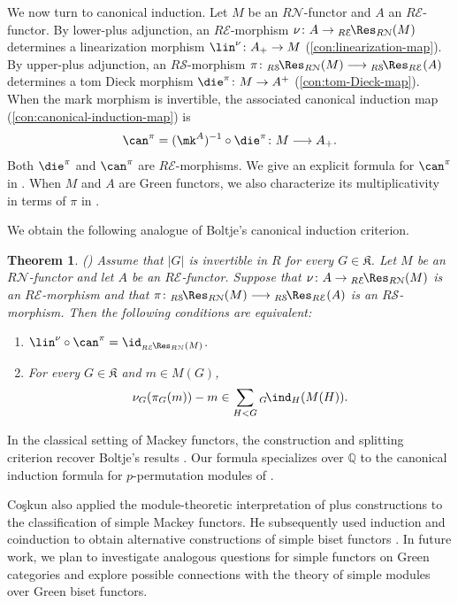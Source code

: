 \documentclass{amsart}
\numberwithin{equation}{section}%
\newtheorem{Thm}[equation]{Theorem}
\theoremstyle{remark}
\theoremstyle{definition}
\newcommand{\e}{\mathcal E}
\newcommand{\s}{\mathcal S}
\newcommand{\n}{\mathcal N}
\newcommand{\lind}[1]{{}_{#1}\!\ind}
\newcommand{\iRes}[2]{{}_{#1}\!\Res_{#2}}
\begin{document}
We now turn to canonical induction. Let $M$ be an
$R\mathcal N$-functor and $A$ an $R\mathcal E$-functor.
By lower-plus adjunction, an $R\mathcal E$-morphism
$\nu\colon A\to\iRes{R\e}{R\n}(M)$
determines a linearization morphism
$\lin^\nu\colon A_+\to M$ (\cref{con:linearization-map}).
By upper-plus adjunction, an $R\mathcal S$-morphism $\pi\colon\iRes{R\s}{R\n}(M)\longrightarrow\iRes{R\s}{R\e}(A)$
determines a tom Dieck morphism $\die^\pi\colon M\to A^+$ (\cref{con:tom-Dieck-map}).
When the mark morphism is invertible, the associated
canonical induction map (\cref{con:canonical-induction-map}) is
\[
\can^\pi=(\mk^A)^{-1}\circ\die^\pi
\colon M\longrightarrow A_+.
\]
Both $\die^\pi$ and $\can^\pi$ are
$R\mathcal E$-morphisms. We give an explicit formula
for $\can^\pi$ in .
When $M$ and $A$ are Green functors, we also
characterize its multiplicativity in terms of $\pi$ in
.


We obtain the following analogue of Boltje's
canonical induction criterion.
%
\begin{Thm}()
\label{thm:intro-canonical-induction}
Assume that $|G|$ is invertible in $R$ for every
$G\in\mathfrak K$. Let $M$ be an
$R\mathcal N$-functor and let $A$ be an
$R\mathcal E$-functor. Suppose that
$\nu\colon A\to\iRes{R\e}{R\n}(M)$
is an $R\mathcal E$-morphism and that
$\pi\colon
\iRes{R\s}{R\n}(M)
\longrightarrow
\iRes{R\s}{R\e}(A)$
is an $R\mathcal S$-morphism.
Then the following conditions are equivalent:
\begin{enumerate}[\rm(a)]
\item
$\lin^\nu\circ\can^\pi
=\id_{\iRes{R\e}{R\n}(M)}$.
\item
For every $G\in\mathfrak K$ and $m\in M(G)$,
\[
\nu_G(\pi_G(m))-m\in \sum\limits_{H<G}\lind{G}_H(M(H)).
\]
\end{enumerate}
\end{Thm}
%
In the classical setting of Mackey functors, the construction
and splitting criterion recover Boltje's results
\cite{Boltje98a}. Our formula specializes
over $\mathbb Q$ to the canonical induction formula
for $p$-permutation modules of \cite{BarkerMutlu19}.


Co\c{s}kun \cite{Coskun07} also applied the module-theoretic 
interpretation of plus constructions to the classification 
of simple Mackey functors. He subsequently used induction 
and coinduction to obtain alternative constructions of 
simple biset functors \cite{Coskun08}. In future work, 
we plan to investigate analogous questions for simple 
functors on Green categories and explore possible 
connections with the theory of simple modules over 
Green biset functors.
\end{document}
